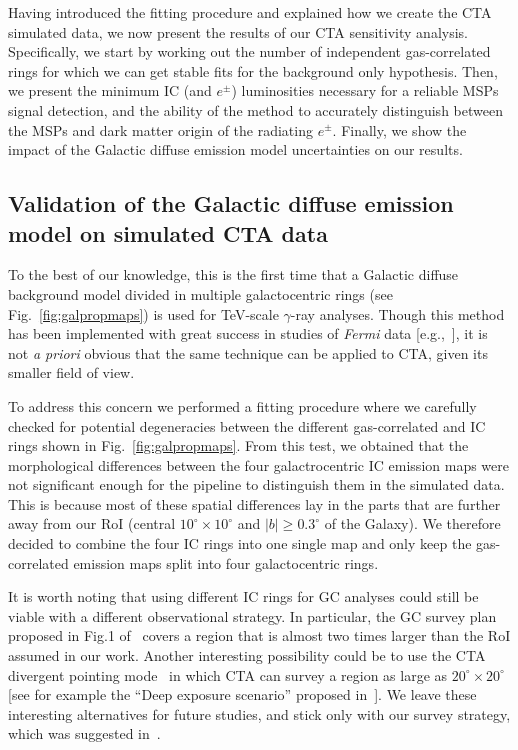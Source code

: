 \documentclass[doublespace,draft,nopageskip]{VTthesis} %
\begin{document}
Having introduced the fitting procedure and explained how we create the CTA simulated data, we now present the results of our CTA sensitivity analysis.
Specifically, we start by working out the number of independent gas-correlated rings for which we can get stable fits for the background only hypothesis. Then, we present the minimum IC (and $e^\pm$) luminosities necessary for a reliable MSPs signal detection, and the ability of the method to accurately distinguish between the MSPs and dark matter origin of the radiating $e^\pm$. Finally, we show the impact of the Galactic diffuse emission model uncertainties on our results.

\subsection{Validation of the Galactic diffuse emission model on simulated CTA data}
\label{subsec:validationGDE}

To the best of our knowledge, this is the first time that a Galactic diffuse background model divided in multiple galactocentric rings (see Fig.~\ref{fig:galpropmaps}) is used for TeV-scale $\gamma$-ray analyses. Though this method has been implemented with great success in studies of \textit{Fermi} data [e.g.,~\citet{Fermi-LAT:4FGL}], it is not {\it a priori} obvious that the same technique can be applied to CTA, given its smaller field of view.

To address this concern
we performed a fitting procedure where we carefully checked for potential degeneracies between the different gas-correlated and IC rings shown in Fig.~\ref{fig:galpropmaps}. From this test, we obtained that the morphological differences between the four galactrocentric IC emission maps were not significant enough for the pipeline to distinguish them in the simulated data. This is because most of these spatial differences lay in the parts that are further away from our RoI (central $10^\circ\times10^\circ$ and $|b|\geq0.3^\circ$ of the Galaxy). We therefore decided to
combine the four IC rings into one single map and only keep the gas-correlated emission
maps split into four galactocentric rings.

It is worth noting that using different IC rings for GC analyses could still be viable with a different observational strategy. In particular, the GC survey plan proposed in Fig.1 of~\citet{Acharyya:2020sbj} covers a region that is almost two times larger than the RoI assumed in our work. Another interesting possibility could be to use the CTA divergent pointing mode~\citep{Gerard:2015gge} in which CTA can survey a region as large as $20^\circ \times 20^\circ$ [see for example the ``Deep exposure scenario'' proposed in~\cite{Coronado-Blazquez:2021avx}]. We leave these interesting alternatives for future studies, and stick only with our survey strategy, which was suggested in~\citet{Rinchiuso:2020skh}. 
\end{document}
